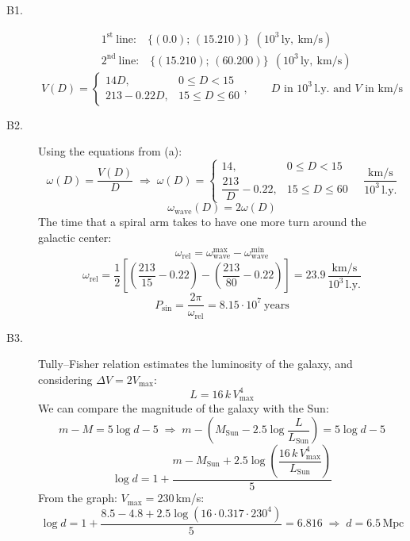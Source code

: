 \begin{description}
\item[B1.] \mbox{}
  \begin{align*}
    &1^{\mathrm{st}}\ \text{line:}\quad \{(0.0);\,(15.210)\}\ \
      (10^3\,\mathrm{ly},\ \mathrm{km/s}) \\
    &2^{\mathrm{nd}}\ \text{line:}\quad \{(15.210);\,(60.200)\}\ \
      (10^3\,\mathrm{ly},\ \mathrm{km/s})
  \end{align*}
  \[ V(D) = \begin{cases} 14D, & 0 \le D < 15 \\
       213 - 0.22D, & 15 \le D \le 60 \end{cases}, \qquad
     D \text{ in } 10^3\,\mathrm{l.y.} \text{ and } V \text{ in km/s} \]

\item[B2.] Using the equations from (a):
  \[ \omega(D) = \frac{V(D)}{D} \;\Rightarrow\;
     \omega(D) = \begin{cases} 14, & 0 \le D < 15 \\[2pt]
       \dfrac{213}{D} - 0.22, & 15 \le D \le 60 \end{cases}
     \quad \frac{\mathrm{km/s}}{10^3\,\mathrm{l.y.}} \]
  \[ \omega_{\mathrm{wave}}(D) = 2\omega(D) \]
  The time that a spiral arm takes to have one more turn around the galactic
  center:
  \[ \omega_{\mathrm{rel}} = \omega_{\mathrm{wave}}^{\mathrm{max}}
     - \omega_{\mathrm{wave}}^{\mathrm{min}} \]
  \[ \omega_{\mathrm{rel}} = \frac{1}{2}\left[
       \left(\frac{213}{15} - 0.22\right)
       - \left(\frac{213}{80} - 0.22\right)\right]
     = 23.9\,\frac{\mathrm{km/s}}{10^3\,\mathrm{l.y.}}
  \]
  \[ P_{\mathrm{sin}} = \frac{2\pi}{\omega_{\mathrm{rel}}}
     = 8.15\cdot 10^{7}\ \text{years} \]

\item[B3.] Tully--Fisher relation estimates the luminosity of the galaxy, and
  considering $\Delta V = 2V_{\mathrm{max}}$:
  \[ L = 16\,k\,V_{\mathrm{max}}^{4} \]
  We can compare the magnitude of the galaxy with the Sun:
  \[ m - M = 5\log d - 5 \;\Rightarrow\;
     m - \left(M_{\mathrm{Sun}}
       - 2.5\log\frac{L}{L_{\mathrm{Sun}}}\right) = 5\log d - 5 \]
  \[ \log d = 1 + \frac{m - M_{\mathrm{Sun}}
       + 2.5\log\!\left(\dfrac{16\,k\,V_{\mathrm{max}}^{4}}
       {L_{\mathrm{Sun}}}\right)}{5} \]
  From the graph: $V_{\mathrm{max}} = 230$\,km/s:
  \[ \log d = 1 + \frac{8.5 - 4.8
       + 2.5\log\!\left(16\cdot 0.317\cdot 230^{4}\right)}{5}
     = 6.816 \;\Rightarrow\; d = 6.5\,\mathrm{Mpc} \]


\end{description}
